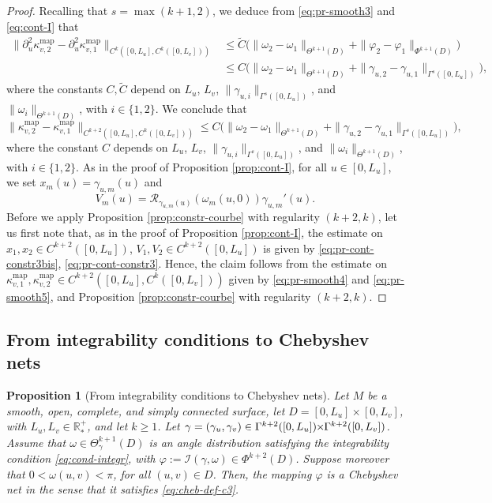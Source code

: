 \documentclass{article}
\newcommand{\I}{\mathcal{I}}
\newcommand{\RR}{\mathcal{R}}
\newcommand{\PLH}{{\mkern-1mu\times\mkern-1mu}}
\newcommand{\Times}{\PLH}
\newcommand{\R}{\mathbb{R}}
\newcommand{\surf}{M}
\newcommand{\kop}{\kappa^{\mathrm{map}}}
\newcommand{\DU}{\partial_{u}}
\newtheorem{proposition}[theorem]{Proposition}
\theoremstyle{remark}
\theoremstyle{prpart}
\begin{document}
\begin{proof}
  Recalling that $s=\max(k+1,2)$, we deduce from \eqref{eq:pr-smooth3} and \eqref{eq:cont-I} that
\begin{align*}
      \big\|\DU^2\kop_{v,2}-\DU^2\kop_{v,1}\big\|_{C^{k}([0,L_u],C^{k}([0,L_v]))} &\leq \tilde C\Big(\|\omega_2-\omega_1\|_{\Theta^{k+1}(D)} +\|\varphi_2-\varphi_1\|_{\Phi^{k+1}(D)}\Big)\\
      &\leq C\Big(\|\omega_2-\omega_1\|_{\Theta^{k+1}(D)} + \|\gamma_{u,2}-\gamma_{u,1}\|_{\Gamma^{s}([0,L_u])}\Big),
\end{align*}
where the constants $C,\tilde C$ depend on $L_u$, $L_v$, $\|\gamma_{u,i}\|_{\Gamma^{s}([0,L_u])}$, and $\|\omega_i\|_{\Theta^{k+1}(D)}$, with $i\in\{1,2\}$. We conclude that 
\begin{equation}\label{eq:pr-smooth5}
      \big\|\kop_{v,2}-\kop_{v,1}\big\|_{C^{k+2}([0,L_u],C^{k}([0,L_v]))} \leq C\Big(\|\omega_2-\omega_1\|_{\Theta^{k+1}(D)} + \|\gamma_{u,2}-\gamma_{u,1}\|_{\Gamma^{s}([0,L_u])}\Big),
    \end{equation}
 where the constant $C$ depends on $L_u$, $L_v$, $\|\gamma_{u,i}\|_{\Gamma^{s}([0,L_u])}$, and $\|\omega_i\|_{\Theta^{k+1}(D)}$, with $i\in\{1,2\}$.   
   As in the proof of Proposition \ref{prop:cont-I}, for all $u\in[0,L_u]$, we set $x_m(u) = \gamma_{u,m}(u)$ and
  \begin{equation*}
    V_m(u) = \RR_{\gamma_{u,m}(u)}(\omega_m(u,0))\gamma_{u,m}'(u).
  \end{equation*} 
Before we apply Proposition \ref{prop:constr-courbe} with regularity $(k+2,k)$, let us first note that, as in the proof of Proposition \ref{prop:cont-I}, the estimate on $x_1,x_2\in C^{k+2}([0,L_u])$, $V_1,V_2\in C^{k+2}([0,L_u])$ is given by \eqref{eq:pr-cont-constr3bis}, \eqref{eq:pr-cont-constr3}. Hence, the claim follows from the estimate on $\kop_{v,1},\kop_{v,2}\in C^{k+2}([0,L_u],C^k([0,L_v]))$ given by \eqref{eq:pr-smooth4} and \eqref{eq:pr-smooth5}, and Proposition \ref{prop:constr-courbe} with regularity $(k+2,k)$.
\end{proof}

\subsection{From integrability conditions to Chebyshev nets}\label{sec:reg-cheb}
\begin{proposition}[From integrability conditions to Chebyshev nets]\label{prop:cheb}
Let $\surf$ be a smooth, open, complete, and simply connected surface, let $D = [0,L_u]\times[0,L_v]$, with $L_u,L_v\in\R^+_\ast$, and let $k\geq 1$. Let $\gamma=(\gamma_u,\gamma_v)\in\Gamma^{k+2}([0,L_u])\Times\Gamma^{k+2}([0,L_v])$. Assume that $\omega\in\Theta^{k+1}_{\gamma}(D)$ is an angle distribution satisfying the integrability condition \eqref{eq:cond-integr}, with $\varphi:=\I(\gamma,\omega)\in\Phi^{k+2}(D)$. Suppose moreover that $0<\omega(u,v)<\pi$, for all $(u,v)\in D$. Then, the mapping $\varphi$ is a Chebyshev net in the sense that it satisfies \eqref{eq:cheb-def-c3}.
\end{proposition}
\end{document}
